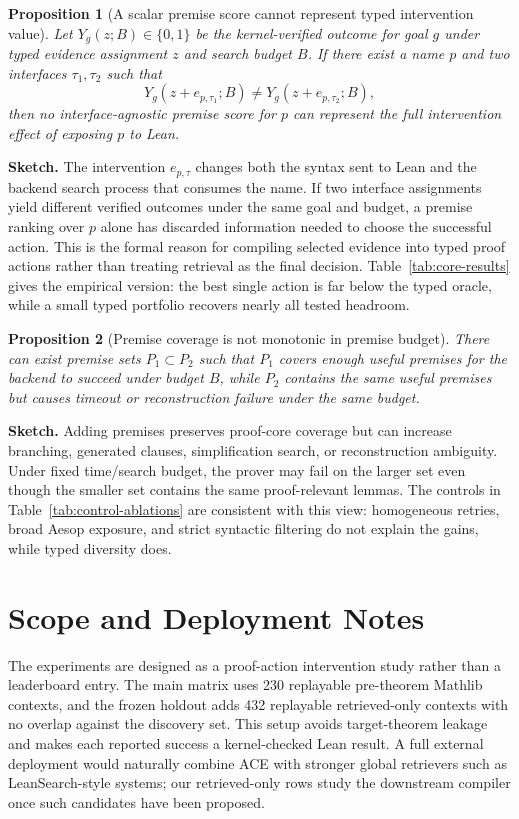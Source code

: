 \documentclass{article}
\newtheorem{proposition}{Proposition}
\newcommand{\tap}{\textsc{ACE}}
\begin{document}
\begin{proposition}[A scalar premise score cannot represent typed intervention value]
Let $Y_g(z;B)\in\{0,1\}$ be the kernel-verified outcome for goal $g$ under typed evidence assignment $z$ and search budget $B$. If there exist a name $p$ and two interfaces $\tau_1,\tau_2$ such that
\[
Y_g(z+e_{p,\tau_1};B)\ne Y_g(z+e_{p,\tau_2};B),
\]
then no interface-agnostic premise score for $p$ can represent the full intervention effect of exposing $p$ to Lean.
\end{proposition}

\noindent\textbf{Sketch.}
The intervention $e_{p,\tau}$ changes both the syntax sent to Lean and the backend search process that consumes the name. If two interface assignments yield different verified outcomes under the same goal and budget, a premise ranking over $p$ alone has discarded information needed to choose the successful action. This is the formal reason for compiling selected evidence into typed proof actions rather than treating retrieval as the final decision. Table~\ref{tab:core-results} gives the empirical version: the best single action is far below the typed oracle, while a small typed portfolio recovers nearly all tested headroom.

\begin{proposition}[Premise coverage is not monotonic in premise budget]
There can exist premise sets $P_1\subset P_2$ such that $P_1$ covers enough useful premises for the backend to succeed under budget $B$, while $P_2$ contains the same useful premises but causes timeout or reconstruction failure under the same budget.
\end{proposition}

\noindent\textbf{Sketch.}
Adding premises preserves proof-core coverage but can increase branching, generated clauses, simplification search, or reconstruction ambiguity. Under fixed time/search budget, the prover may fail on the larger set even though the smaller set contains the same proof-relevant lemmas. The controls in Table~\ref{tab:control-ablations} are consistent with this view: homogeneous retries, broad Aesop exposure, and strict syntactic filtering do not explain the gains, while typed diversity does.

\section{Scope and Deployment Notes}

The experiments are designed as a proof-action intervention study rather than a leaderboard entry. The main matrix uses 230 replayable pre-theorem Mathlib contexts, and the frozen holdout adds 432 replayable retrieved-only contexts with no overlap against the discovery set. This setup avoids target-theorem leakage and makes each reported success a kernel-checked Lean result. A full external deployment would naturally combine \tap{} with stronger global retrievers such as LeanSearch-style systems; our retrieved-only rows study the downstream compiler once such candidates have been proposed.
\end{document}

